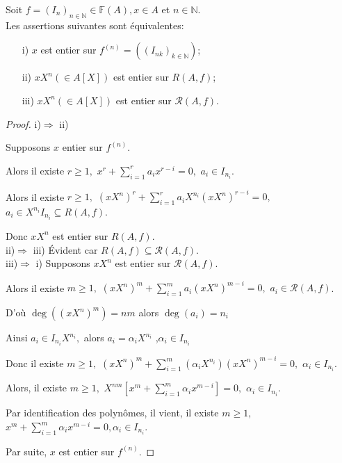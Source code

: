 \begin{maproposition}
	\label{maprop1}
	Soit $f=(I_n)_{n \in \mathbb{N}} \in \mathbb{F}(A), x \in A $ et $n \in \mathbb{N}$.\\
	Les assertions suivantes sont équivalentes: \\
	\begin{enumerate}
		\item[i)] $x$ est entier sur $f^{(n)}=((I_{nk})_{k \in \mathbb{N}})$;
		\item[ii)] $xX^n(\in A[X])$ est entier sur $R(A,f)$;
		\item[iii)] $xX^n(\in A[X])$ est entier sur $ \mathcal{R}(A,f)$.
	\end{enumerate}
	\begin{proof}
		i)$\Rightarrow$ ii)
		
		Supposons $x$ entier sur $f^{(n)}$.
		
		Alors il existe $r\geq 1,$ $x^{r}+\sum\limits_{i=1}^{r}a_{i}x^{r-i}=0,$ $
		a_{i}\in I_{n_{i}}$.
		
		Alors il existe $r\geq 1,$ $(xX^{n})^{r}+\sum
		\limits_{i=1}^{r}a_{i}X^{n_{i}}(xX^{n})^{r-i}=0,$ $a_{i}\in
		X^{n_{i}}I_{n_{i}}\subseteq R(A,f)$.
		
		Donc $xX^{n}$ est entier sur $R(A,f).$ \\
		
		ii)$\Rightarrow$ iii) Évident car $R(A,f)\subseteq \mathcal{R}(A,f).$ \\
		iii)$\Rightarrow$ i) Supposons $xX^{n}$ est entier sur $\mathcal{R}(A,f).$
		
		Alors il existe $m\geq 1,$ $(xX^{n})^{m}+\sum\limits_{i=1}^{m}a_{i}(xX^{n})^{m-i}=0,$ $a_{i}\in \mathcal{R}(A,f)$.
		
		D'où $\deg ((xX^{n})^{m})=nm$ alors $\deg (a_{i})=n_{i}$
		
		Ainsi $a_{i}\in I_{n_{i}}X^{n_{i}},$ alors $a_{i}=\alpha _{i}X^{n_{i}}$ ,$\alpha _{i}\in I_{n_{i}}$
		
		Donc il existe $m\geq 1,$ $(xX^{n})^{m}+\sum\limits_{i=1}^{m}(\alpha
		_{i}X^{n_{i}})(xX^{n})^{m-i}=0,$ $\alpha _{i}\in I_{n_{i}}$.
		
		Alors, il existe $m\geq 1,$ $X^{nm}[x^{m}+\sum\limits_{i=1}^{m}\alpha
		_{i}x^{m-i}]=0,$ $\alpha _{i}\in I_{n_{i}}$.
		
		Par identification des polynômes, il vient, il existe $m\geq 1,$ $
		x^{m}+\sum\limits_{i=1}^{m}\alpha _{i}x^{m-i}=0,\alpha _{i}\in I_{n_{i}}$.
		
		Par suite, $x$ est entier sur $f^{(n)}$.
	\end{proof}
\end{maproposition}
